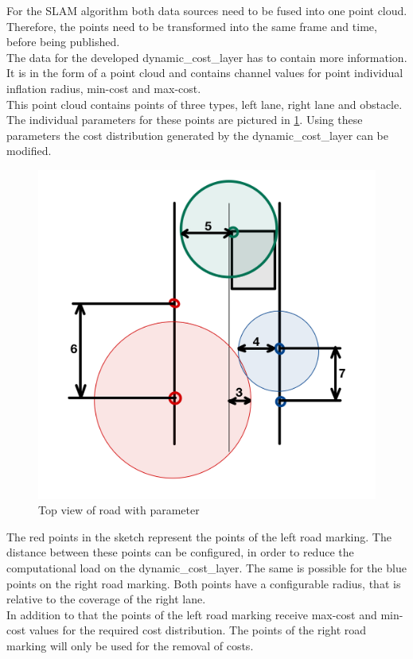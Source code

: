 For the SLAM algorithm both data sources need to be fused into one point cloud. Therefore, the points need to be transformed into the same frame and time, before being published.\\

The data for the developed dynamic\_cost\_layer has to contain more information. It is in the form of a point cloud and contains channel values for point individual inflation radius, min-cost and max-cost.\\ 

This point cloud contains points of three types, left lane, right lane and obstacle.
The individual parameters for these points are pictured in \ref{markparams}. Using these parameters the cost distribution generated by the dynamic\_cost\_layer can be modified.\\

\begin{figure} 
	\centering
	\includegraphics[width=.7\textwidth]{Pictures/markfreespace parameter erklaerung}
	\caption{Top view of road with parameter}
	\label{markparams}
\end{figure}

The red points in the sketch represent the points of the left road marking. The distance between these points can be configured, in order to reduce the computational load on the dynamic\_cost\_layer. The same is possible for the blue points on the right road marking. Both points have a configurable radius, that is relative to the coverage of the right lane.\\
In addition to that the points of the left road marking receive max-cost and min-cost values for the required cost distribution. The points of the right road marking will only be used for the removal of costs.\\

